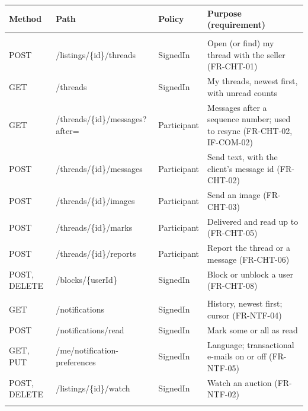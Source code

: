 \documentclass[11pt,a4paper]{article}
\begin{document}
{\small
\begin{longtable}{@{}>{\ttfamily\raggedright\arraybackslash}p{1.55cm}>{\ttfamily\raggedright\arraybackslash}p{4.8cm}>{\raggedright\arraybackslash}p{2.4cm}>{\raggedright\arraybackslash}p{6.1cm}@{}}
\toprule
\textnormal{\textbf{Method}} & \textnormal{\textbf{Path}} & \textbf{Policy} & \textbf{Purpose (requirement)} \\ \midrule \endhead
\multicolumn{4}{@{}l}{\textbf{Chat}} \\
POST & /\allowbreak listings/\allowbreak \{id\}/\allowbreak threads & SignedIn & Open (or find) my thread with the seller (FR-CHT-01) \\
GET & /\allowbreak threads & SignedIn & My threads, newest first, with unread counts \\
GET & /\allowbreak threads/\allowbreak \{id\}/\allowbreak messages?\allowbreak after= & Participant & Messages after a sequence number; used to resync (FR-CHT-02, IF-COM-02) \\
POST & /\allowbreak threads/\allowbreak \{id\}/\allowbreak messages & Participant & Send text, with the client's message id (FR-CHT-02) \\
POST & /\allowbreak threads/\allowbreak \{id\}/\allowbreak images & Participant & Send an image (FR-CHT-03) \\
POST & /\allowbreak threads/\allowbreak \{id\}/\allowbreak marks & Participant & Delivered and read up to (FR-CHT-05) \\
POST & /\allowbreak threads/\allowbreak \{id\}/\allowbreak reports & Participant & Report the thread or a message (FR-CHT-06) \\
POST, DELETE & /\allowbreak blocks/\allowbreak \{userId\} & SignedIn & Block or unblock a user (FR-CHT-08) \\
\multicolumn{4}{@{}l}{\textbf{Notifications}} \\
GET & /\allowbreak notifications & SignedIn & History, newest first; cursor (FR-NTF-04) \\
POST & /\allowbreak notifications/\allowbreak read & SignedIn & Mark some or all as read \\
GET, PUT & /\allowbreak me/\allowbreak notification-\allowbreak preferences & SignedIn & Language; transactional e-mails on or off (FR-NTF-05) \\
POST, DELETE & /\allowbreak listings/\allowbreak \{id\}/\allowbreak watch & SignedIn & Watch an auction (FR-NTF-02) \\
\multicolumn{4}{@{}l}{\textbf{Providers and staff}} \\

\end{longtable}}
\end{document}
